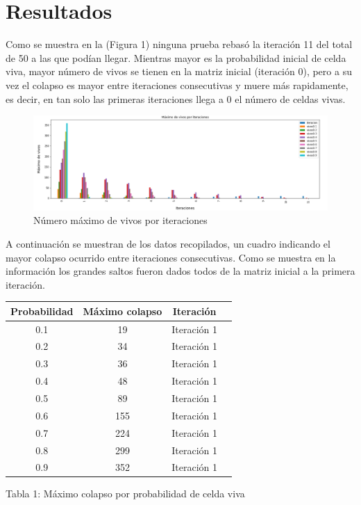 \documentclass{article}
\begin{document}
\section{Resultados}
Como se muestra en la (Figura 1) ninguna prueba rebasó la iteración 11 del total de 50 a las que podían llegar. Mientras mayor es la probabilidad inicial de celda viva, mayor número de vivos se tienen en la matriz inicial (iteración 0), pero a su vez el colapso es mayor entre iteraciones consecutivas y muere más rapidamente, es decir, en tan solo las primeras iteraciones llega a 0 el número de celdas vivas. 

\begin{figure}[H]
    \centering

    \includegraphics[scale=0.6]{Captura1.png}
    \caption{Número máximo de vivos por iteraciones}
    \label{fig:f1}
\end{figure}


A continuación se muestran de los datos recopilados, un cuadro indicando el  mayor colapso ocurrido entre iteraciones consecutivas. Como se muestra en la información los grandes saltos fueron dados todos de la matriz inicial a la primera iteración.
\begin{center}
\begin{tabular}{|c|c|c|c|}
\hline 
Probabilidad & Máximo colapso & Iteración \\ 
\hline 
0.1 & 19 & Iteración 1 \\ 
\hline 
0.2 & 34 & Iteración 1 \\ 
\hline 
0.3 & 36 & Iteración 1 \\ 
\hline 
0.4 & 48 & Iteración 1 \\ 
\hline 
0.5 & 89 & Iteración 1 \\ 
\hline 
0.6 & 155 & Iteración 1 \\ 
\hline 
0.7 & 224 & Iteración 1 \\ 
\hline 
0.8 & 299 & Iteración 1 \\
\hline 
0.9 & 352 & Iteración 1 \\ 
\hline
\end{tabular}
\end{center}
\begin{center}
	Tabla 1: Máximo colapso por probabilidad de celda viva
\end{center}
\end{document}
